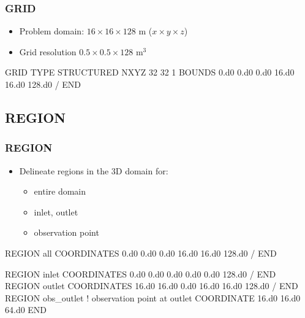\documentclass{beamer}
\newcommand\bluecomment[1]{{{\color{blue} #1}}}
\begin{document}
\begin{frame}\frametitle{\bf GRID}

\begin{itemize}
  \item Problem domain: $16 \times 16 \times 128$ m ($x \times y \times z$)
  \item Grid resolution $0.5 \times 0.5 \times 128$ m$^3$
\end{itemize}

\begin{semiverbatim}
GRID
  TYPE STRUCTURED
  NXYZ 32 32 1
  BOUNDS
    0.d0 0.d0 0.d0
    16.d0 16.d0 128.d0
  /
END
\end{semiverbatim}

\end{frame}

\subsection{REGION}

\begin{frame}\frametitle{\bf REGION}

\begin{itemize}
  \item Delineate regions in the 3D domain for:
  \begin{itemize}
    \item entire domain
    \item inlet, outlet
    \item observation point
  \end{itemize}
\end{itemize}

\begin{semiverbatim}
REGION all
  COORDINATES
    0.d0 0.d0 0.d0
    16.d0 16.d0 128.d0
  /
END

\newpage
\vspace{-5mm}
REGION inlet
  COORDINATES
    0.d0 0.d0 0.d0
    0.d0 0.d0 128.d0
  /
END
REGION outlet
  COORDINATES
    16.d0 16.d0 0.d0
    16.d0 16.d0 128.d0
  /
END
REGION obs_outlet \bluecomment{! observation point at outlet}
  COORDINATE 16.d0 16.d0 64.d0
END

\end{semiverbatim}

\end{frame}
\end{document}
